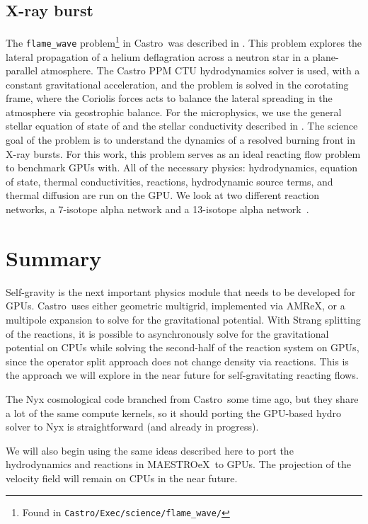 \documentclass[preprint,times]{aastex62}
\newcommand{\castro}{{\sf Castro}}
\newcommand{\maestroex}{{\sf MAESTROeX}}
\begin{document}
\subsection{X-ray burst}

The {\tt flame\_wave} problem\footnote{Found in {\tt Castro/Exec/science/flame\_wave/}} in \castro\ was described in
\cite{astronum:2018}.  This problem explores the lateral propagation
of a helium deflagration across a neutron star in a plane-parallel
atmosphere.  The Castro PPM CTU hydrodynamics solver is used, with a
constant gravitational acceleration, and the problem is solved in the
corotating frame, where the Coriolis forces acts to balance the
lateral spreading in the atmosphere via geostrophic balance.  For the
microphysics, we use the general stellar equation of state of
\citep{timmes_swesty:2000} and the stellar conductivity described in
\citep{Timmes00}.  The science goal of the problem is to understand the
dynamics of a resolved burning front in X-ray bursts.  For this work,
this problem serves as an ideal reacting flow problem to benchmark
GPUs with.  All of the necessary physics: hydrodynamics, equation of
state, thermal conductivities, reactions, hydrodynamic source terms,
and thermal diffusion are run on the GPU.  We look at two different
reaction networks, a 7-isotope alpha network and a 13-isotope alpha
network~\citep{iso7}.



\section{Summary}

Self-gravity is the next important physics module that needs to be
developed for GPUs.  \castro\ uses either geometric multigrid,
implemented via AMReX, or a multipole expansion to solve for the
gravitational potential.  With Strang splitting of the reactions, it
is possible to asynchronously solve for the gravitational potential on
CPUs while solving the second-half of the reaction system on GPUs,
since the operator split approach does not change density via
reactions.  This is the approach we will explore in the near future
for self-gravitating reacting flows.

The Nyx cosmological code branched from \castro\ some time ago, but
they share a lot of the same compute kernels, so it should porting the
GPU-based hydro solver to Nyx is straightforward (and already in
progress).

We will also begin using the same ideas described here to port the
hydrodynamics and reactions in \maestroex\ to GPUs.  The projection of
the velocity field will remain on CPUs in the near future.
\end{document}
